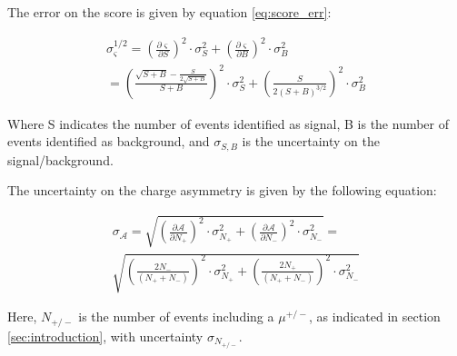 \documentclass[%
 reprint,
 amsmath,amssymb,
 aps,
]{revtex4-2}
\begin{document}
The error on the score is given by equation \ref{eq:score_err}:

\begin{multline}\label{eq:score_err}
    \sigma_{\varsigma}^{1/2} = \left(\frac{\partial \varsigma}{\partial S}\right)^2 \cdot \sigma_S^2 + \left(\frac{\partial \varsigma}{\partial B}\right)^2 \cdot \sigma_B^2 \\
    = \left(\frac{\sqrt{S + B} - \frac{S}{2\sqrt{S+B}}}{S + B }\right)^2 \cdot \sigma_S^2 + \left(\frac{S}{2 \left(S+B\right)^{3/2}}\right)^2 \cdot \sigma_B^2
\end{multline}

Where S indicates the number of events identified as signal, B is the number of events identified as background, and $\sigma_{S,B}$ is the uncertainty on the signal/background.

The uncertainty on the charge asymmetry is given by the following equation:

\begin{multline}\label{eq:charge_asym_err}
    \sigma_{\mathcal{A}} = \sqrt{
    \left(\frac{\partial \mathcal{A}}{\partial N_+}\right)^2 \cdot \sigma_{N_+}^2 + \left(\frac{\partial \mathcal{A}}{\partial N_-}\right)^2 \cdot \sigma_{N_-}^2
    } 
    = \\ 
    \sqrt{
    \left(\frac{2 N_-}{\left(N_+ + N_- \right)}\right)^2 \cdot \sigma_{N_+}^2 + \left(\frac{2 N_+}{\left(N_+ + N_- \right)}\right)^2 \cdot \sigma_{N_-}^2
    } 
\end{multline}

Here, $N_{+/-}$ is the number of events including a $\mu^{+/-}$, as indicated in section \ref{sec:introduction}, with uncertainty $\sigma_{N_{+/-}}$.




\end{document}
